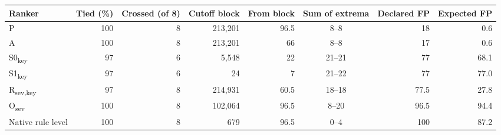 \begin{tabular}{lrrrrcrr}
\toprule
Ranker & Tied (\%) & Crossed (of 8) & Cutoff block & From block & Sum of extrema & Declared FP & Expected FP \\
\midrule
P & 100 & 8 & 213,201 & 96.5 & 8--8 & 18 & 0.6 \\
A & 100 & 8 & 213,201 & 66 & 8--8 & 17 & 0.6 \\
S0\textsubscript{key} & 97 & 6 & 5,548 & 22 & 21--21 & 77 & 68.1 \\
S1\textsubscript{key} & 97 & 6 & 24 & 7 & 21--22 & 77 & 77.0 \\
R\textsubscript{sev,key} & 97 & 8 & 214,931 & 60.5 & 18--18 & 77.5 & 27.8 \\
O\textsubscript{sev} & 100 & 8 & 102,064 & 96.5 & 8--20 & 96.5 & 94.4 \\
Native rule level & 100 & 8 & 679 & 96.5 & 0--4 & 100 & 87.2 \\
\bottomrule
\end{tabular}
